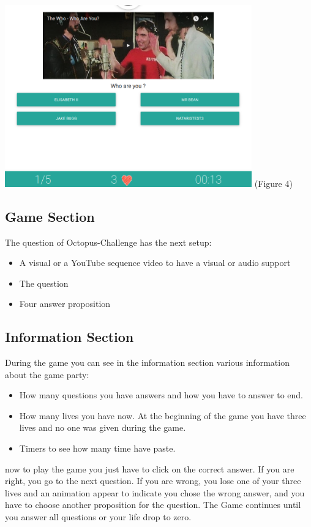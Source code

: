 \documentclass[a4paper,11pt, oneside]{book}
\begin{document}
\begin{center}
	\includegraphics[width=0.8\textwidth]{CGame.png}
	(Figure 4)
\end{center}

\subsection{Game Section}
 The question of Octopus-Challenge has the next setup:
 	\begin{itemize}
		\item A visual or a YouTube sequence video to have a visual or audio support
		\item The question
		\item Four answer proposition
	\end{itemize}

\subsection{Information Section}
	During the game you can see in the information section various information about the game party:
	\begin{itemize}
	\item How many questions you have answers and how you have to answer to end.
	\item How many lives you have now. At the beginning of the game you have three lives and no one was given during the game.
	\item Timers to see how many time have paste.
	\end{itemize}

now to play the game you just have to click on the correct answer.
If you are right, you go to the next question.
If you are wrong, you lose one of your three lives and an animation appear to indicate you chose the wrong answer, and you have to choose another proposition for the question.
The Game continues until you answer all questions or your life drop to zero.
\end{document}
